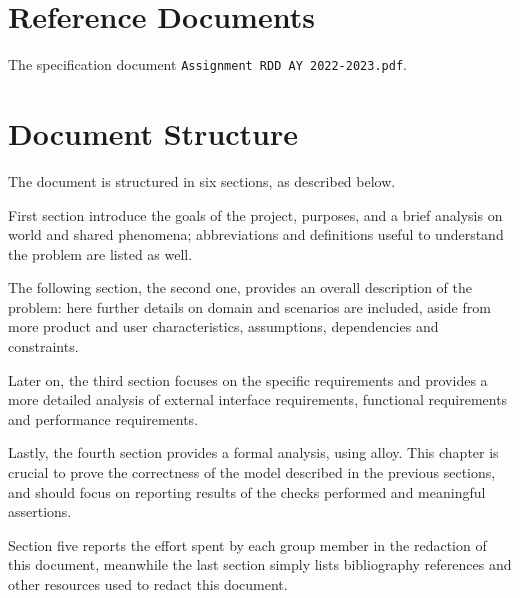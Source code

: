 \section{Reference Documents}
\label{sec:reference_documents}%
The specification document \verb|Assignment RDD AY 2022-2023.pdf|.


\section{Document Structure}
\label{sec:document_structure}%
The document is structured in six sections, as described below.

First section introduce the goals of the project, purposes, and a brief analysis on world and shared phenomena;
abbreviations and definitions useful to understand the problem are listed as well.

The following section, the second one, provides an overall description of the problem: here further
details on domain and scenarios are included, aside from more product and user characteristics, assumptions,
dependencies and constraints.

Later on, the third section focuses on the specific requirements and provides a more detailed analysis of external
interface requirements, functional requirements and performance requirements.

Lastly, the fourth section provides a formal analysis, using alloy.
This chapter is crucial to prove the correctness of the model described in the previous sections, and should focus on
reporting results of the checks performed and meaningful assertions.

Section five reports the effort spent by each group member in the redaction of this document, meanwhile the last
section simply lists bibliography references and other resources used to redact this document.

